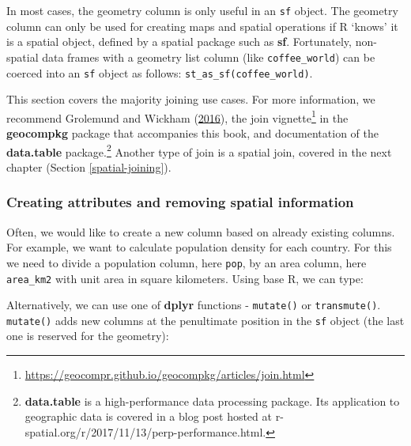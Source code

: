 \documentclass[]{krantz}
\newenvironment{Shaded}{\begin{snugshade}}{\end{snugshade}}
\newcommand{\CommentTok}[1]{\textcolor[rgb]{0.37,0.37,0.37}{\textit{#1}}}
\newcommand{\NormalTok}[1]{#1}
\newcommand{\OperatorTok}[1]{\textcolor[rgb]{0.43,0.43,0.43}{\textbf{#1}}}
\newcommand{\StringTok}[1]{\textcolor[rgb]{0.5,0.5,0.5}{#1}}
\let\rmarkdownfootnote\footnote%
\def\footnote{\protect\rmarkdownfootnote}
\renewcommand{\href}[2]{#2\footnote{\url{#1}}}
\let\BeginKnitrBlock\begin \let\EndKnitrBlock\end
\begin{document}
\BeginKnitrBlock{rmdnote}
In most cases, the geometry column is only useful in an \texttt{sf} object.
The geometry column can only be used for creating maps and spatial operations if R `knows' it is a spatial object, defined by a spatial package such as \textbf{sf}.
Fortunately, non-spatial data frames with a geometry list column (like \texttt{coffee\_world}) can be coerced into an \texttt{sf} object as follows: \texttt{st\_as\_sf(coffee\_world)}.
\EndKnitrBlock{rmdnote}

This section covers the majority joining use cases.
For more information, we recommend Grolemund and Wickham (\protect\hyperlink{ref-grolemund_r_2016}{2016}), the \href{https://geocompr.github.io/geocompkg/articles/join.html}{join vignette} in the \textbf{geocompkg} package that accompanies this book, and documentation of the \textbf{data.table} package.\footnote{\textbf{data.table} is a high-performance data processing package.
  Its application to geographic data is covered in a blog post hosted at r-spatial.org/r/2017/11/13/perp-performance.html.}
Another type of join is a spatial join, covered in the next chapter (Section \ref{spatial-joining}).

\hypertarget{vec-attr-creation}{%
\subsubsection{Creating attributes and removing spatial information}\label{vec-attr-creation}}

Often, we would like to create a new column based on already existing columns.
For example, we want to calculate population density for each country.
For this we need to divide a population column, here \texttt{pop}, by an area column, here \texttt{area\_km2} with unit area in square kilometers.
Using base R, we can type:

\begin{Shaded}
\end{Shaded}

Alternatively, we can use one of \textbf{dplyr} functions - \texttt{mutate()} or \texttt{transmute()}.
\texttt{mutate()} adds new columns at the penultimate position in the \texttt{sf} object (the last one is reserved for the geometry):
\end{document}
